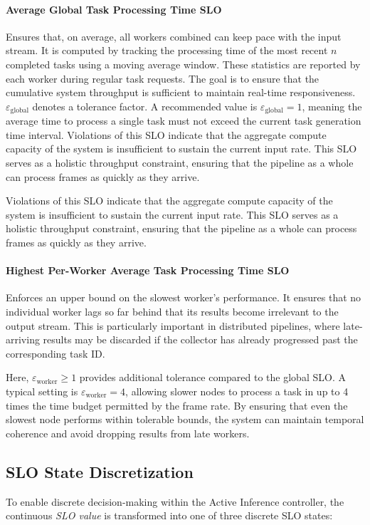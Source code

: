 \paragraph{Average Global Task Processing Time SLO} Ensures that, on average, all workers combined can keep pace with the input stream. It is computed by tracking the processing time of the most recent \(n\) completed tasks using a moving average window. These statistics are reported by each worker during regular task requests. The goal is to ensure that the cumulative system throughput is sufficient to maintain real-time responsiveness. \(\varepsilon_\text{global}\) denotes a tolerance factor. A recommended value is \(\varepsilon_\text{global} = 1\), meaning the average time to process a single task must not exceed the current task generation time interval. Violations of this SLO indicate that the aggregate compute capacity of the system is insufficient to sustain the current input rate. This SLO serves as a holistic throughput constraint, ensuring that the pipeline as a whole can process frames as quickly as they arrive.

Violations of this SLO indicate that the aggregate compute capacity of the system is insufficient to sustain the current input rate. This SLO serves as a holistic throughput constraint, ensuring that the pipeline as a whole can process frames as quickly as they arrive.

\paragraph{Highest Per-Worker Average Task Processing Time SLO} Enforces an upper bound on the slowest worker’s performance. It ensures that no individual worker lags so far behind that its results become irrelevant to the output stream. This is particularly important in distributed pipelines, where late-arriving results may be discarded if the collector has already progressed past the corresponding task ID.

Here, \(\varepsilon_\text{worker} \geq 1\) provides additional tolerance compared to the global SLO. A typical setting is \(\varepsilon_\text{worker} = 4\), allowing slower nodes to process a task in up to 4 times the time budget permitted by the frame rate. By ensuring that even the slowest node performs within tolerable bounds, the system can maintain temporal coherence and avoid dropping results from late workers.

\subsection{SLO State Discretization}
To enable discrete decision-making within the Active Inference controller, the continuous \textit{SLO value} is transformed into one of three discrete SLO states:

